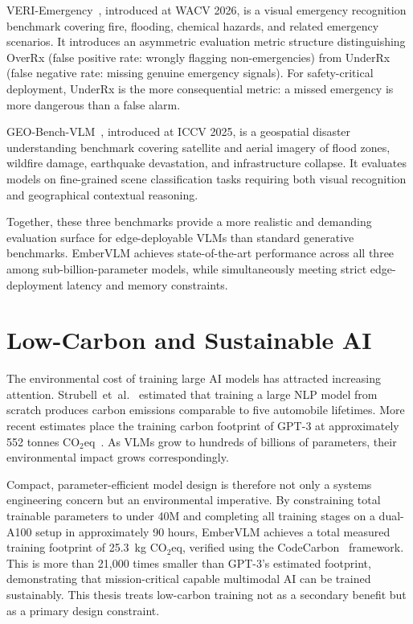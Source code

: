 VERI-Emergency~\cite{choi2026better}, introduced at WACV 2026, is a visual emergency recognition benchmark covering fire, flooding, chemical hazards, and related emergency scenarios. It introduces an asymmetric evaluation metric structure distinguishing OverRx (false positive rate: wrongly flagging non-emergencies) from UnderRx (false negative rate: missing genuine emergency signals). For safety-critical deployment, UnderRx is the more consequential metric: a missed emergency is more dangerous than a false alarm.

GEO-Bench-VLM~\cite{danish2025geobench}, introduced at ICCV 2025, is a geospatial disaster understanding benchmark covering satellite and aerial imagery of flood zones, wildfire damage, earthquake devastation, and infrastructure collapse. It evaluates models on fine-grained scene classification tasks requiring both visual recognition and geographical contextual reasoning.

Together, these three benchmarks provide a more realistic and demanding evaluation surface for edge-deployable VLMs than standard generative benchmarks. EmberVLM achieves state-of-the-art performance across all three among sub-billion-parameter models, while simultaneously meeting strict edge-deployment latency and memory constraints.

\section{Low-Carbon and Sustainable AI}
\label{sec:related_carbon}

The environmental cost of training large AI models has attracted increasing attention. Strubell~et~al.~\cite{strubell2019energy} estimated that training a large NLP model from scratch produces carbon emissions comparable to five automobile lifetimes. More recent estimates place the training carbon footprint of GPT-3 at approximately 552 tonnes CO$_2$eq~\cite{patterson2021carbon}. As VLMs grow to hundreds of billions of parameters, their environmental impact grows correspondingly.

Compact, parameter-efficient model design is therefore not only a systems engineering concern but an environmental imperative. By constraining total trainable parameters to under 40M and completing all training stages on a dual-A100 setup in approximately 90 hours, EmberVLM achieves a total measured training footprint of 25.3~kg CO$_2$eq, verified using the CodeCarbon~\cite{codecarbon} framework. This is more than 21,000 times smaller than GPT-3's estimated footprint, demonstrating that mission-critical capable multimodal AI can be trained sustainably. This thesis treats low-carbon training not as a secondary benefit but as a primary design constraint.
